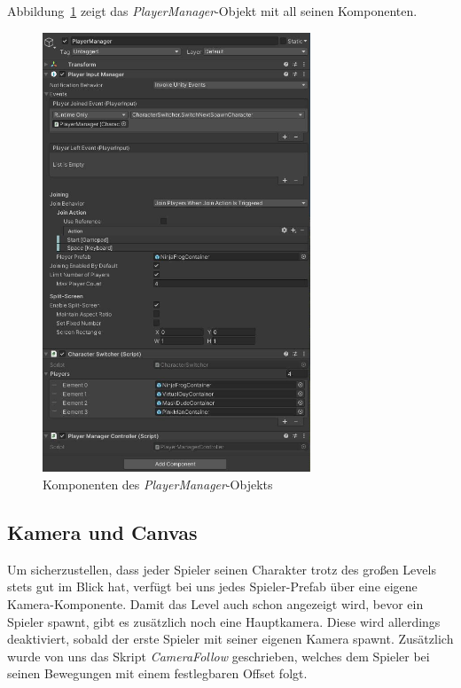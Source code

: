 Abbildung~\ref{fig:player-manager} zeigt das \textit{PlayerManager}-Objekt mit all seinen Komponenten.\\

\begin{figure}[th]
\centering
\includegraphics[width=80mm]{Figures/player-manager.jpg}
\decoRule
\caption[Komponenten des \textit{PlayerManager}-Objekts]{Komponenten des \textit{PlayerManager}-Objekts}
\label{fig:player-manager}
\end{figure}

\subsection{Kamera und Canvas}
\label{section: camera_canvas}

Um sicherzustellen, dass jeder Spieler seinen Charakter trotz des großen Levels stets gut im Blick hat, verfügt bei uns jedes Spieler-Prefab über eine eigene Kamera-Komponente. Damit das Level auch schon angezeigt wird, bevor ein Spieler spawnt, gibt es zusätzlich noch eine Hauptkamera. Diese wird allerdings deaktiviert, sobald der erste Spieler mit seiner eigenen Kamera spawnt. Zusätzlich wurde von uns das Skript \textit{CameraFollow} geschrieben, welches dem Spieler bei seinen Bewegungen mit einem festlegbaren Offset folgt.\\

